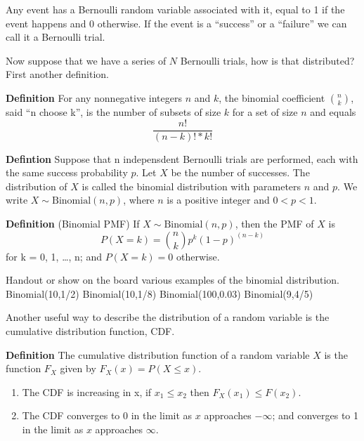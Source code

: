 \documentclass[]{article}
\begin{document}
Any event has a Bernoulli random variable associated with it, equal to 1 if the event happens and 0 otherwise. If the event is a ``success'' or a ``failure'' we can call it a Bernoulli trial.

Now suppose that we have a series of $N$ Bernoulli trials, how is that distributed? First another definition.

\vspace{0.1in}
\textbf{Definition} For any nonnegative integers $n$ and $k$, the binomial coefficient $\binom{n}{k}$, said ``n choose k'', is the number of subsets of size $k$ for a set of size $n$ and equals 
\begin{equation}
	\frac{n!}{(n - k)! * k!}
\end{equation}

\vspace{0.1in}
\textbf{Defintion} Suppose that n indepensdent Bernoulli trials are performed, each with the same success probability $p$. Let $X$ be the number of successes. The distribution of $X$ is called the binomial distribution with parameters $n$ and $p$. We write $X \sim \text{Binomial}(n,p)$, where $n$ is a positive integer and $0 < p < 1$.

\vspace{0.1in}
\textbf{Definition} (Binomial PMF) If $X \sim \text{Binomial}(n,p)$, then the PMF of $X$ is 
\begin{equation}
P(X = k) = \binom{n}{k} p^{k} (1-p)^{(n-k)}
\end{equation}
for k = 0, 1, \ldots, n; and $P(X = k) = 0$ otherwise.

\vspace{0.1in}
Handout or show on the board various examples of the binomial distribution. 
Binomial(10,1/2) 
Binomial(10,1/8) 
Binomial(100,0.03)
Binomial(9,4/5)

Another useful way to describe the distribution of a random variable is the cumulative distribution function, CDF.

\textbf{Definition} The cumulative distribution function of a random variable $X$ is the function $F_X$ given by $F_X(x) = P(X \leq x)$.
\begin{enumerate}
\item
The CDF is increasing in x, if $x_1 \leq x_2$ then $F_X(x_1) \leq F(x_2)$. 
\item
The CDF converges to 0 in the limit as $x$ approaches $-\infty$; and converges to 1 in the limit as $x$ approaches $\infty$.
\end{enumerate}
\end{document}
